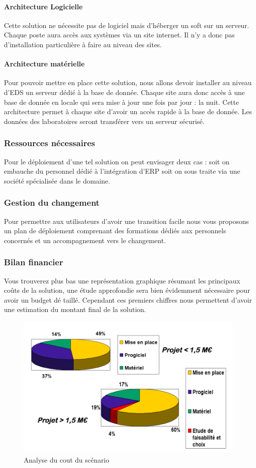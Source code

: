 \paragraph{Architecture Logicielle}
Cette solution ne nécessite pas de logiciel mais d'héberger un soft sur un serveur. Chaque poste aura accès aux systèmes via un site internet. Il n'y a donc pas d'installation particulière à faire au niveau des sites.
\paragraph{Architecture matérielle}
Pour pouvoir mettre en place cette solution, nous allons devoir installer au niveau d'EDS un serveur dédié à la base de donnée. Chaque site aura donc accès à une base de donnée en locale qui sera mise à jour une fois par jour : la nuit. Cette architecture permet à chaque site d'avoir un accès rapide à la base de donnée. Les données des laboratoires seront transférer vers un serveur sécurisé. 
\subsubsection{Ressources nécessaires}
Pour le déploiement d'une tel solution on peut envisager deux cas : soit on embauche du personnel dédié à l'intégration d'ERP soit on sous traite via une société spécialisée dans le domaine.
\subsubsection{Gestion du changement}
Pour permettre aux utilisateurs d'avoir une transition facile nous vous proposons un plan de déploiement comprenant des formations dédiés aux personnels concernés et un accompagnement vers le changement.
\subsubsection{Bilan financier}
Vous trouverez plus bas une représentation graphique résumant les principaux coûts de la solution, une étude approfondie sera bien évidemment nécessaire pour avoir un budget dé	taillé. Cependant ces premiers chiffres nous permettent d'avoir une estimation du montant final de la solution.
\begin{figure}[H]
\begin{center}
 \includegraphics[scale=0.4]{CoutSolution.png}
  \caption{Analyse du cout du scénario}
\end{center}  
\end{figure}
